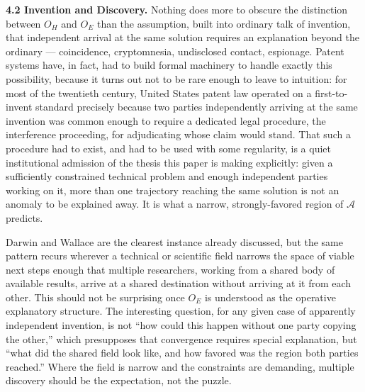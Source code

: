 \documentclass[11pt]{article}
\theoremstyle{plain}
\begin{document}
\textbf{4.2 Invention and Discovery.} Nothing does more to obscure the distinction between \(O_H\) and \(O_E\) than the assumption, built into ordinary talk of invention, that independent arrival at the same solution requires an explanation beyond the ordinary --- coincidence, cryptomnesia, undisclosed contact, espionage. Patent systems have, in fact, had to build formal machinery to handle exactly this possibility, because it turns out not to be rare enough to leave to intuition: for most of the twentieth century, United States patent law operated on a first-to-invent standard precisely because two parties independently arriving at the same invention was common enough to require a dedicated legal procedure, the interference proceeding, for adjudicating whose claim would stand. That such a procedure had to exist, and had to be used with some regularity, is a quiet institutional admission of the thesis this paper is making explicitly: given a sufficiently constrained technical problem and enough independent parties working on it, more than one trajectory reaching the same solution is not an anomaly to be explained away. It is what a narrow, strongly-favored region of \(\mathcal{A}\) predicts.

Darwin and Wallace are the clearest instance already discussed, but the same pattern recurs wherever a technical or scientific field narrows the space of viable next steps enough that multiple researchers, working from a shared body of available results, arrive at a shared destination without arriving at it from each other. This should not be surprising once \(O_E\) is understood as the operative explanatory structure. The interesting question, for any given case of apparently independent invention, is not ``how could this happen without one party copying the other,'' which presupposes that convergence requires special explanation, but ``what did the shared field look like, and how favored was the region both parties reached.'' Where the field is narrow and the constraints are demanding, multiple discovery should be the expectation, not the puzzle.
\end{document}
